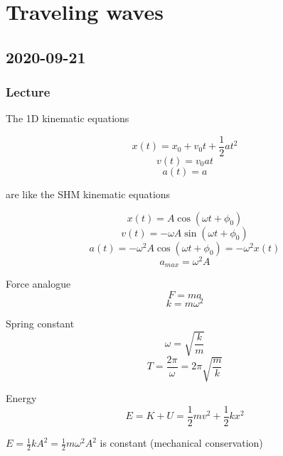 \chapter{Traveling waves}

\section{2020-09-21}

\subsection{Lecture}

The 1D kinematic equations 

$$x(t) = x_0 + v_0t + \frac{1}{2}at^2$$
$$v(t) = v_0 at$$
$$a(t) = a$$

are like the SHM kinematic equations 

$$x(t) = A\cos(\omega t + \phi_0)$$
$$v(t) = -\omega A\sin(\omega t + \phi_0)$$
$$a(t) = -\omega^2 A\cos(\omega t + \phi_0) = -\omega^2 x(t)$$
$$a_{max} = \omega^2 A$$

Force analogue
$$F = ma$$
$$k = m\omega^2$$

Spring constant
$$\omega = \sqrt{\frac{k}{m}}$$
$$T = \frac{2\pi}{\omega} = 2\pi \sqrt{\frac{m}{k}}$$

Energy
$$E = K + U = \frac{1}{2}mv^2 + \frac{1}{2}kx^2$$

$E = \frac{1}{2}kA^2 = \frac{1}{2} m \omega^2 A^2$ is constant (mechanical conservation)
